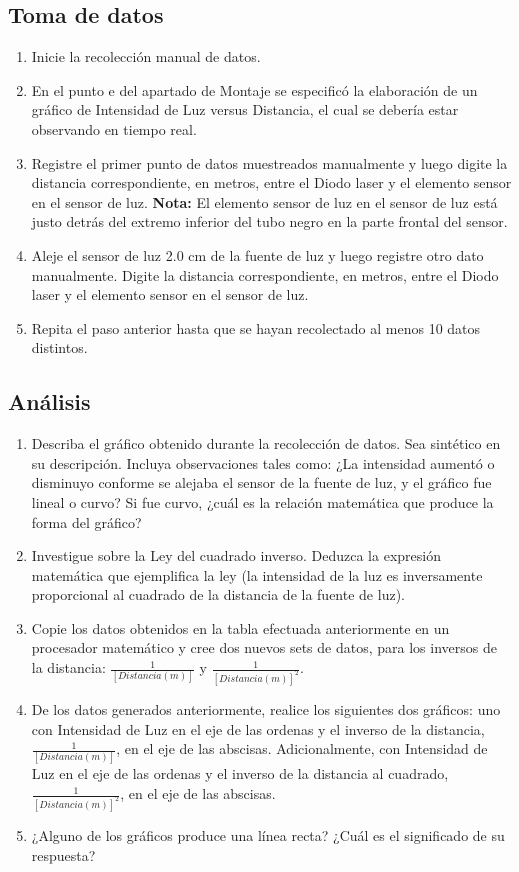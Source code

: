\documentclass[12pt,letterpaper]{report}
\begin{document}
\subsection{Toma de datos}
\begin{enumerate}
    \item Inicie la recolección manual de datos. 
    \item En el punto e del apartado de Montaje se especificó la elaboración de un gráfico de Intensidad de Luz versus Distancia, el cual se debería estar observando en tiempo real.
    \item Registre el primer punto de datos muestreados manualmente y luego digite la distancia correspondiente, en metros, entre el Diodo laser y el elemento sensor en el sensor de luz. \textbf{Nota:} El elemento sensor de luz en el sensor de luz está justo detrás del extremo inferior del tubo negro en la parte frontal del sensor.
    \item Aleje el sensor de luz 2.0 cm de la fuente de luz y luego registre otro dato manualmente. Digite la distancia correspondiente, en metros, entre el Diodo laser y el elemento sensor en el sensor de luz.
    \item Repita el paso anterior hasta que se hayan recolectado al menos 10 datos distintos.
\end{enumerate}

\subsection{Análisis}
\begin{enumerate}
    \item Describa el gráfico obtenido durante la recolección de datos. Sea sintético en su descripción. Incluya observaciones tales como: ¿La intensidad aumentó o disminuyo conforme se alejaba el sensor de la fuente de luz, y el gráfico fue lineal o curvo? Si fue curvo, ¿cuál es la relación matemática que produce la forma del gráfico?
    \item Investigue sobre la Ley del cuadrado inverso. Deduzca la expresión matemática que ejemplifica la ley (la intensidad de la luz es inversamente proporcional al cuadrado de la distancia de la fuente de luz).
    \item Copie los datos obtenidos en la tabla efectuada anteriormente en un procesador matemático y cree dos nuevos sets de datos, para los inversos de la distancia: $\frac{1}{[Distancia(m)]}$ y $\frac{1}{[Distancia(m)]^2}$.
    \item De los datos generados anteriormente, realice los siguientes dos gráficos: uno con Intensidad de Luz en el eje de las ordenas y el inverso de la distancia, $\frac{1}{[Distancia(m)]}$, en el eje de las abscisas. Adicionalmente, con Intensidad de Luz en el eje de las ordenas y el inverso de la distancia al cuadrado, $\frac{1}{[Distancia(m)]^2}$, en el eje de las abscisas.
    \item ¿Alguno de los gráficos produce una línea recta? ¿Cuál es el significado de su respuesta?
\end{enumerate}







\end{document}

